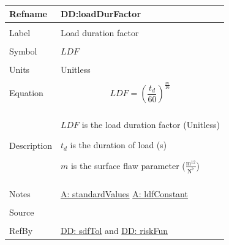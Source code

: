 \documentclass[12pt]{article}
\begin{document}
\noindent \begin{minipage}{\textwidth}
          \begin{tabular}{>{\raggedright}p{}>{\raggedright\arraybackslash}p{}}
          \toprule \textbf{Refname} & \textbf{DD:loadDurFactor}
          \label{DD:loadDurFactor}
          \\ \midrule \\
          Label & Load duration factor
          \\ \midrule \\
          Symbol & $LDF$
          \\ \midrule \\
          Units & Unitless
          \\ \midrule \\
          Equation & \begin{displaymath}
                     LDF=\left(\frac{{t_{d}}}{60}\right)^{\frac{m}{16}}
                     \end{displaymath}
          \\ \midrule \\
          Description & \begin{symbDescription}
                        \item{$LDF$ is the load duration factor (Unitless)}
                        \item{${t_{d}}$ is the duration of load (s)}
                        \item{$m$ is the surface flaw parameter ($\frac{\text{m}^{12}}{\text{N}^{7}}$)}
                        \end{symbDescription}
          \\ \midrule \\
          Notes & \hyperref[assumpSV]{A: standardValues}
                  \hyperref[assumpLDFC]{A: ldfConstant}
          \\ \midrule \\
          Source & \cite{astm2009}
          \\ \midrule \\
          RefBy & \hyperref[DD:sdfTol]{DD: sdfTol} and \hyperref[DD:riskFun]{DD: riskFun}
          \\ \bottomrule
          \end{tabular}
          \end{minipage}
\par~
\end{document}
